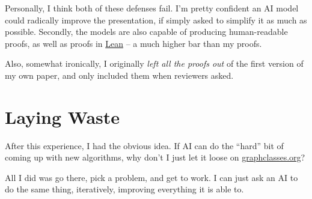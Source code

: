 \documentclass[11pt]{article}
\begin{document}
Personally, I think both of these defenses fail. I'm pretty confident an AI model could radically improve the presentation, if simply asked to simplify it as much as possible.
Secondly, the models are also capable of producing human-readable proofs, as well as proofs in \href{https://lean-lang.org/}{Lean} -- a much higher bar than my proofs.

Also, somewhat ironically, I originally \textit{left all the proofs out} of the first version of my own paper, and only included them when reviewers asked.

\section{Laying Waste}

After this experience, I had the obvious idea. If AI can do the ``hard'' bit of coming up with new algorithms, why don't I just let it loose on \href{https://www.graphclasses.org}{graphclasses.org}?

All I did was go there, pick a problem, and
get to work. I can just ask an AI to do the same thing, iteratively, improving everything it is able to.
\end{document}
